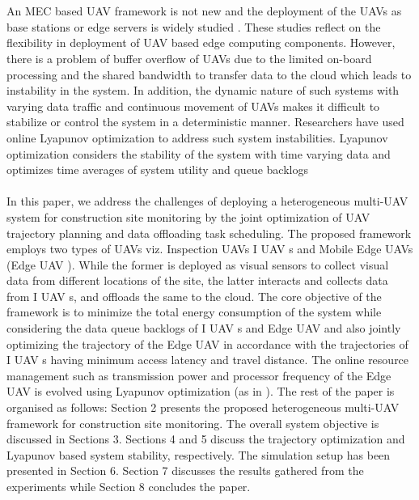 \documentclass[twocolumn]{article}
\begin{document}
\\
\\
An MEC based UAV framework is not new and the deployment of the UAVs as base stations or edge servers
is widely studied \cite{wan2019towards} \cite{abbas2017mobile}. These studies reflect on the flexibility in deployment of UAV based edge computing
components. However, there is a problem of buffer overflow of UAVs due to the limited on-board processing and
the shared bandwidth to transfer data to the cloud which
leads to instability in the system. In addition, the dynamic nature of such systems with varying data traffic
and continuous movement of UAVs makes it difficult to
stabilize or control the system in a deterministic manner. Researchers have used online Lyapunov optimization
\cite{neely2010stochastic} to address such system instabilities. Lyapunov optimization considers the stability of the system with time
varying data and optimizes time averages of system utility
and queue backlogs
\\
\\
In this paper, we address the challenges of deploying
a heterogeneous multi-UAV system for construction site
monitoring by the joint optimization of UAV trajectory
planning and data offloading task scheduling. The proposed framework employs two types of UAVs viz. Inspection UAVs I UAV s and Mobile Edge UAVs (Edge UAV ).
While the former is deployed as visual sensors to collect
visual data from different locations of the site, the latter
interacts and collects data from I UAV s, and offloads the
same to the cloud. The core objective of the framework
is to minimize the total energy consumption of the system while considering the data queue backlogs of I UAV s
and Edge UAV and also jointly optimizing the trajectory
of the Edge UAV in accordance with the trajectories of
I UAV s having minimum access latency and travel distance. The online resource management such as transmission power and processor frequency of the Edge UAV is
evolved using Lyapunov optimization (as in \cite{zhang2018stochastic}).
The rest of the paper is organised as follows: Section
2 presents the proposed heterogeneous multi-UAV framework for construction site monitoring. The overall system
objective is discussed in Sections 3. Sections 4 and 5 discuss the trajectory optimization and Lyapunov based system stability, respectively. The simulation setup has been
presented in Section 6. Section 7 discusses the results
gathered from the experiments while Section 8 concludes
the paper.
\end{document}
